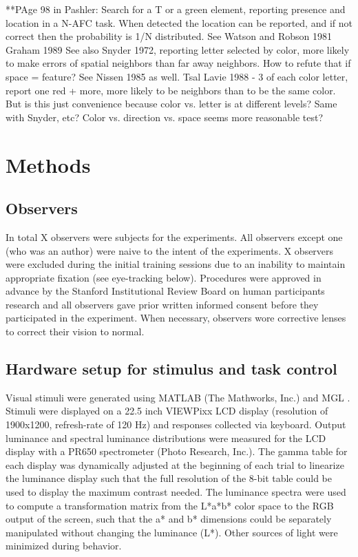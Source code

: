 \documentclass{report}
\begin{document}
**PAge 98 in Pashler:
Search for a T or a green element, reporting presence and location in a N-AFC task. When detected the location can be reported, and if not correct then the probability is 1/N distributed. 
See Watson and Robson 1981
Graham 1989
See also Snyder 1972, reporting letter selected by color, more likely to make errors of spatial neighbors than far away neighbors. How to refute that if space = feature? See Nissen 1985 as well.
Tsal Lavie 1988 - 3 of each color letter, report one red + more, more likely to be neighbors than to be the same color. But is this just convenience because color vs. letter is at different levels? Same with Snyder, etc? Color vs. direction vs. space seems more reasonable test?


\section{Methods}

\subsection{Observers}
In total X observers were subjects for the experiments. All observers except one (who was an author) were naive to the intent of the experiments. X observers were excluded during the initial training sessions due to an inability to maintain appropriate fixation (see eye-tracking below). Procedures were approved in advance by the Stanford Institutional Review Board on human participants research and all observers gave prior written informed consent before they participated in the experiment. When necessary, observers wore corrective lenses to correct their vision to normal.

\subsection{Hardware setup for stimulus and task control}

Visual stimuli were generated using MATLAB (The Mathworks, Inc.) and MGL \citep{Gardner2018-uq}. Stimuli were displayed on a 22.5 inch VIEWPixx LCD display (resolution of 1900x1200, refresh-rate of 120 Hz) and responses collected via keyboard. Output luminance and spectral luminance distributions were measured for the LCD display with a PR650 spectrometer (Photo Research, Inc.). The gamma table for each display was dynamically adjusted at the beginning of each trial to linearize the luminance display such that the full resolution of the 8-bit table could be used to display the maximum contrast needed. The luminance spectra were used to compute a transformation matrix from the L*a*b* color space to the RGB output of the screen, such that the a* and b* dimensions could be separately manipulated without changing the luminance (L*). Other sources of light were minimized during behavior.
\end{document}
